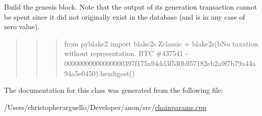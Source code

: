 Build the genesis block. Note that the output of its generation transaction cannot be spent since it did not originally exist in the database (and is in any case of zero value).

\begin{quote}
\begin{quote}
\begin{quote}
from pyblake2 import blake2s \textquotesingle{}Zclassic\textquotesingle{} + blake2s(b\textquotesingle{}No taxation without representation. B\+TC \#437541 -\/ 00000000000000000397f175a94dd3f530b957182eb2a9f7b79a44a94a5e0450\textquotesingle{}).hexdigest() \end{quote}
\end{quote}
\end{quote}


The documentation for this class was generated from the following file\+:\begin{DoxyCompactItemize}
\item 
/\+Users/christopherarguello/\+Developer/anon/src/\mbox{\hyperlink{chainparams_8cpp}{chainparams.\+cpp}}\end{DoxyCompactItemize}
